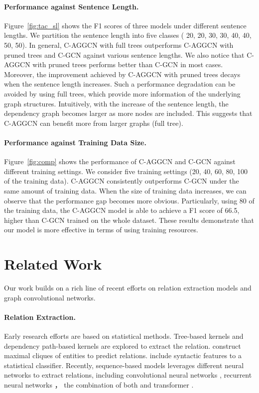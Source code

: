 \documentclass[11pt,a4paper]{article}
\begin{document}
\paragraph{Performance against Sentence Length.} Figure~\ref{fig:tac_sl} shows the F1 scores of three models  under different sentence lengths.  We partition the sentence length into five classes ( 20, 20, 30, 30, 40, 40, 50,  50). In general, C-AGGCN  with full trees outperforms C-AGGCN with pruned trees and C-GCN against various sentence lengths.  We also notice that C-AGGCN with pruned trees performs better than C-GCN in most cases. Moreover, the improvement achieved by C-AGGCN with pruned trees decays when the sentence length increases. Such a performance degradation can be avoided by using full trees, which provide more information of the underlying graph structures. Intuitively, with the increase of the sentence length, the dependency graph becomes larger as more nodes are included. This suggests that C-AGGCN can benefit more  from larger graphs (full tree).



\paragraph{Performance against Training Data Size.}
Figure~\ref{fig:comp} shows the performance of C-AGGCN and C-GCN  against different training settings. We consider five training settings (20, 40, 60, 80, 100 of the training data). C-AGGCN consistently outperforms C-GCN under the same amount of training data. When the size of training data increases, we can observe that the performance gap becomes more obvious. Particularly, using 80 of the training data, the C-AGGCN model is able to achieve a F1 score of 66.5, higher than C-GCN trained on the whole dataset. These results demonstrate that our model is more effective in terms of using training resources.

\section{Related Work}
\label{sec:4}

Our work builds on a rich line of recent efforts on relation extraction models and graph convolutional networks.

\paragraph{Relation Extraction.} 
Early research efforts are based on statistical methods. Tree-based kernels \citep{Zelenko2002KernelMF} and dependency path-based kernels \citep{Bunescu2005ASP} are explored to extract the relation. \citet{McDonald2005SimpleAF} construct maximal cliques of entities to predict relations. \citet{Mintz2009DistantSF} include syntactic features to a statistical classifier. Recently, sequence-based models leverages different neural networks to extract relations, including convolutional neural networks \citep{Zeng2014RelationCV, Nguyen2015RelationEP, Wang2016RelationCV}, recurrent neural networks \citep{Zhou2016AttentionBasedBL, Zhang2017PositionawareAA}， the combination of both \citep{Vu2016CombiningRA} and transformer \citep{Verga2018SimultaneouslyST}. 
\end{document}
